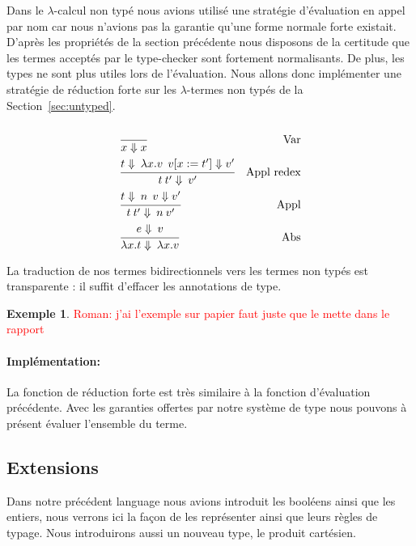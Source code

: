 \documentclass {article}
\newcommand{\codefrom}[3]
           {}
\theoremstyle{definition}
\newtheorem{example}{Exemple}
\theoremstyle{remark}
\newcommand{\todo}[1]{\textcolor{red}{#1}}
\begin{document}
\label{reduction_forte}
Dans le \(\lambda\)-calcul non typé nous avions utilisé une stratégie d'évaluation en appel par nom
car nous n'avions pas la garantie qu'une forme normale forte existait.
D'après les propriétés de la section précédente nous disposons de la certitude que les termes acceptés  par le type-checker sont fortement normalisants. De plus, les types ne sont plus utiles lors de l'évaluation. 
Nous allons donc implémenter une stratégie de réduction forte sur les \(\lambda\)-termes non typés de la Section~\ref{sec:untyped}.

\begin{align*}
  &\cfrac{}
  {x \Downarrow x}&\mbox{Var} \\
  &\cfrac{t \Downarrow \: \lambda x.v \:\: v[x := t']\Downarrow v'}
  {t\:t'\Downarrow \: v'}&\mbox{Appl redex} \\
  &\cfrac{t \Downarrow \: n \:\: v \Downarrow v'}
  {t\:t'\Downarrow \: n \: v'}&\mbox{Appl} \\
  &\cfrac{e \Downarrow \: v}
  {\lambda x.t \Downarrow \: \lambda x.v}&\mbox{Abs}
\end{align*}

La traduction de nos termes bidirectionnels vers les termes non typés
est transparente : il suffit d'effacer les annotations de type.

\begin{example}
  \todo{Roman: j'ai l'exemple sur papier faut juste que le mette dans le rapport}
\end{example}

\paragraph{Implémentation:}
\label{reduction_petits_pas}

\codefrom{untyped}{lambda}{reduction_forte}

La fonction de réduction forte est très similaire à la fonction d'évaluation précédente.
Avec les garanties offertes par notre système de type nous pouvons à présent évaluer l'ensemble du
terme. 



\subsection{Extensions} 

Dans notre précédent language nous avions introduit les booléens ainsi que les entiers,
nous verrons ici la façon de les représenter ainsi que leurs règles de typage.
Nous introduirons aussi un nouveau type, le produit cartésien.
\end{document}
